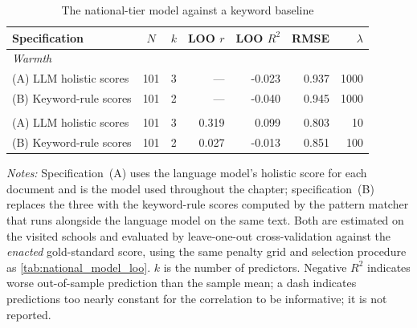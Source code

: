 \begin{table}[htbp]
\centering
\caption{The national-tier model against a keyword baseline}
\label{tab:ridge_spec_comparison}

\small
\footnotesize\setlength{\tabcolsep}{4pt}%
\begin{tabular}{lccrrrr}
\toprule
Specification & $N$ & $k$ & LOO $r$ & LOO $R^2$ & RMSE & $\lambda$ \\
\midrule
\multicolumn{7}{l}{\textit{Warmth}} \\
\quad (A) LLM holistic scores & 101 & 3 & --- & -0.023 & 0.937 & 1000 \\
\quad (B) Keyword-rule scores & 101 & 2 & --- & -0.040 & 0.945 & 1000 \\
\addlinespace
\multicolumn{7}{l}{\textit{Strictness}} \\
\quad (A) LLM holistic scores & 101 & 3 & 0.319 & 0.099 & 0.803 & 10 \\
\quad (B) Keyword-rule scores & 101 & 2 & 0.027 & -0.013 & 0.851 & 100 \\
\bottomrule
\end{tabular}
\begin{minipage}{\linewidth}
\smallskip
\footnotesize\textit{Notes:} Specification~(A) uses the language model's holistic score for each document and is the model used throughout the chapter; specification~(B) replaces the three with the keyword-rule scores computed by the pattern matcher that runs alongside the language model on the same text. Both are estimated on the visited schools and evaluated by leave-one-out cross-validation against the \emph{enacted} gold-standard score, using the same penalty grid and selection procedure as \cref{tab:national_model_loo}. $k$ is the number of predictors. Negative $R^2$ indicates worse out-of-sample prediction than the sample mean; a dash indicates predictions too nearly constant for the correlation to be informative; it is not reported.
\end{minipage}
\end{table}